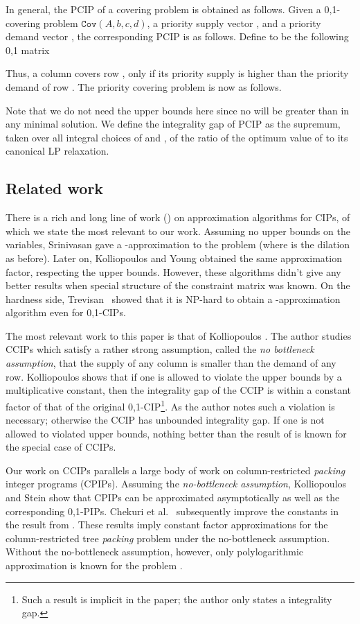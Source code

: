 \documentclass[11pt]{article}
\newcommand{\cov}[1]{\ensuremath{\mathtt{Cov}(#1)}}
\newcommand{\1}{\mathbb{1}}
\begin{document}
In general, the PCIP of a covering problem is obtained as follows.
Given a 0,1-covering problem \cov{A,b,c,d}, a priority supply
vector , and a priority demand vector ,
the corresponding PCIP is as follows. Define  to be the
following 0,1 matrix

Thus, a column  covers row , only if its priority supply is
higher than the priority demand of row .  The priority covering
problem is now as follows.

Note that we do not need the upper bounds here since no  will be
greater than  in any minimal solution.  We define the integrality
gap of PCIP as the supremum, taken over all integral choices of  and
, of the ratio of the optimum value of
 to its canonical LP relaxation.
\fi

\subsection{Related work}\label{sec:rel-work}

There is a rich and long line of work
(\cite{Do82,Ho82,RV93,Sr99,Sr06}) on approximation algorithms for
CIPs, of which we state the most relevant to our work.  Assuming no
upper bounds on the variables, Srinivasan \cite{Sr99} gave a -approximation to the problem (where  is the
dilation as before).  Later on, Kolliopoulos and Young \cite{KY05}
obtained the same approximation factor, respecting the upper
bounds. However, these algorithms didn't give any better results when
special structure of the constraint matrix was known.  On the hardness
side, Trevisan~\cite{Tr01} showed that it is NP-hard to obtain a
-approximation algorithm even for
0,1-CIPs.

The most relevant work to this paper is that of Kolliopoulos
\cite{Ko03}. The author studies CCIPs which satisfy a 
rather strong assumption, called the {\em no bottleneck
  assumption}, that the supply of any column is smaller than the
demand of any row. Kolliopoulos \cite{Ko03} shows that 
 if one is allowed to
violate the upper bounds by a multiplicative constant, then the
integrality gap of the CCIP is within a constant factor of that of the
original 0,1-CIP\footnote{Such a result is implicit in the paper;
  the author only states a  integrality gap.}. As the
author notes such a violation is necessary; otherwise the CCIP has
unbounded integrality gap. If one is not allowed to violated upper
bounds, nothing better than the result of \cite{KY05} is known for
the special case of CCIPs. 

 Our work on CCIPs parallels a large body of work on column-restricted
 {\em packing} integer programs (CPIPs). Assuming the {\em
   no-bottleneck assumption}, Kolliopoulos and Stein \cite{KS04} show
 that CPIPs can be approximated asymptotically as well as the
 corresponding 0,1-PIPs. Chekuri et al.~\cite{CMS07} subsequently
 improve the constants in the result from \cite{KS04}. These results
 imply constant factor approximations for the column-restricted tree
 {\em packing} problem under the no-bottleneck assumption. Without the
 no-bottleneck assumption, however, only polylogarithmic approximation
 is known for the problem \cite{CEK09}.
\end{document}
